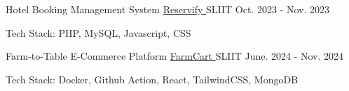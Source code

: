 

\begin{cventries}

  \cventry
    {Hotel Booking Management System} %
    {\href{https://github.com/nmdra/Reservify/}{Reservify  \faGithub}} %
    {SLIIT} %
    {Oct. 2023 - Nov. 2023} %
    {
      \begin{cvitems} %
        \item {Tech Stack: PHP, MySQL, Javascript, CSS}
      \end{cvitems}
    }

  \cventry
    {Farm-to-Table E-Commerce Platform} %
    {\href{https://github.com/nmdra/FarmCart}{FarmCart  \faGithub}} %
    {SLIIT} %
    {June. 2024 - Nov. 2024} %
    {
      \begin{cvitems} %
        \item {Tech Stack: Docker, Github Action, React, TailwindCSS, MongoDB}
      \end{cvitems}
    }

\end{cventries}
